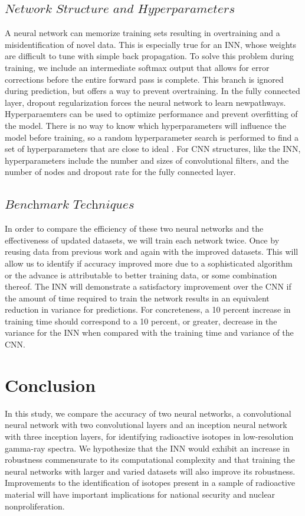 \documentclass{anstrans}
\begin{document}
\subsection{$\textit{Network Structure and Hyperparameters}$}
A neural network can memorize training sets resulting in overtraining and a misidentification of novel data. 
This is especially true for an INN, whose weights are difficult to tune with simple back propagation.
To solve this problem during training, we include an intermediate softmax output that allows for error corrections before the entire forward pass is complete. 
This branch is ignored during prediction, but offers a way to prevent overtraining. 
In the fully connected layer, dropout regularization forces the neural network to learn newpathways. 
Hyperparaemters can be used to optimize performance and prevent overfitting of the model.
There is no way to know which hyperparameters will influence the model before training, so a random hyperparameter search is performed to find a set of hyperparameters that are close to ideal \cite{bergstraRandomSearchHyperParameter}. 
For CNN structures, like the INN, hyperparameters include the number and sizes of convolutional filters, and the number of nodes and dropout rate for the fully connected layer. 
\subsection{$\textit{Benchmark Techniques}$}
In order to compare the efficiency of these two neural networks and the effectiveness of updated datasets, we will train each network twice. 
Once by reusing data from previous work \cite{kamudaMachineLearningApproach2018} and again with the improved datasets. 
This will allow us to identify if accuracy improved more due to a sophisticated algorithm or the advance is attributable to better training data, or some combination thereof. 
The INN will demonstrate a satisfactory improvement over the CNN if the amount of time required to train the network results in an equivalent reduction in variance for predictions. 
For concreteness, a 10 percent increase in training time should correspond to a 10 percent, or greater, decrease in the variance for the INN when compared with the training time and variance of the CNN.

\section{Conclusion}

In this study, we compare the accuracy of two neural networks, a convolutional neural network with two convolutional layers and an inception neural network with three inception layers, for identifying radioactive isotopes in low-resolution gamma-ray spectra. 
We hypothesize that the INN would exhibit an increase in robustness commensurate to its computational complexity and that training the neural networks with larger and varied datasets will also improve its robustness. 
Improvements to the identification of isotopes present in a sample of radioactive material will have important implications for national security and nuclear nonproliferation.
\end{document}
